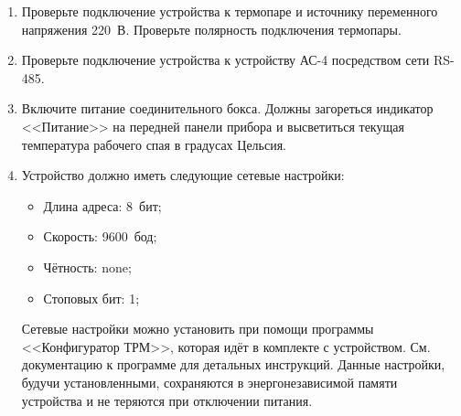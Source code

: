 \begin{enumerate}

\item Проверьте подключение устройства к термопаре и источнику переменного напряжения 220~В. Проверьте полярность подключения термопары.

\item Проверьте подключение устройства к устройству АС-4 посредством сети RS-485.

\item Включите питание соединительного бокса. Должны загореться индикатор <<Питание>> на передней панели прибора и высветиться текущая температура рабочего спая в градусах Цельсия.

\item Устройство должно иметь следующие сетевые настройки:

\begin{itemize}
\item Длина адреса: 8~бит;
\item Скорость: 9600~бод;
\item Чётность: none;
\item Стоповых бит: 1;
\end{itemize}

Сетевые настройки можно установить при помощи программы <<Конфигуратор ТРМ>>, которая идёт в комплекте с устройством. См. документацию к программе для детальных инструкций. Данные настройки, будучи установленными, сохраняются в энергонезависимой памяти устройства и не теряются при отключении питания.

\end{enumerate}
